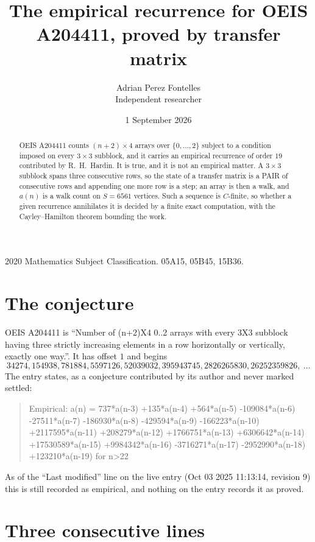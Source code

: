 \documentclass[11pt,a4paper]{article}
\title{The empirical recurrence for OEIS A204411, proved by transfer matrix}
\author{Adrian Perez Fontelles\\ \small Independent researcher}
\date{1 September 2026}
\theoremstyle{plain}
\theoremstyle{definition}
\begin{document}
\maketitle

\begin{abstract}
OEIS A204411 counts $(n+2)\times4$ arrays over $\{0,\dots,2\}$ subject to a condition imposed on
every $3\times3$ subblock, and it carries an empirical recurrence of order $19$
contributed by R.~H.~Hardin. It is true, and it is not an empirical matter. A $3\times3$
subblock spans three consecutive rows, so the state of a transfer matrix is a PAIR of
consecutive rows and appending one more row is a step; an array is then a walk, and
$a(n)$ is a walk count on $S=6561$ vertices. Such a sequence is $C$-finite, so whether a given
recurrence annihilates it is decided by a finite exact computation, with the Cayley--Hamilton
theorem bounding the work.
\end{abstract}

\noindent\small 2020 Mathematics Subject Classification. 05A15, 05B45, 15B36.\normalsize

\section{The conjecture}

OEIS A204411 is ``Number of (n+2)X4 0..2 arrays with every 3X3 subblock having three strictly increasing elements in a row horizontally or vertically, exactly one way.''. It has offset $1$ and begins
\[
34274, 154938, 781884, 5597126, 52039032, 395943745, 2826265830, 26252359826,\ \dots
\]
The entry states, as a conjecture contributed by its author and never marked settled:
\begin{quote}
Empirical: a(n) = 737*a(n-3) +135*a(n-4) +564*a(n-5) -109084*a(n-6) -27511*a(n-7) -186930*a(n-8) -429594*a(n-9) -166223*a(n-10) +2117595*a(n-11) +208279*a(n-12) +1766751*a(n-13) +6306642*a(n-14) +17530589*a(n-15) +9984342*a(n-16) -3716271*a(n-17) -2952990*a(n-18) +123210*a(n-19) for n>22
\end{quote}
As of the ``Last modified'' line on the live entry (Oct 03 2025 11:13:14, revision 9) this is still
recorded as empirical, and nothing on the entry records it as proved.

\section{Three consecutive lines}
\end{document}
